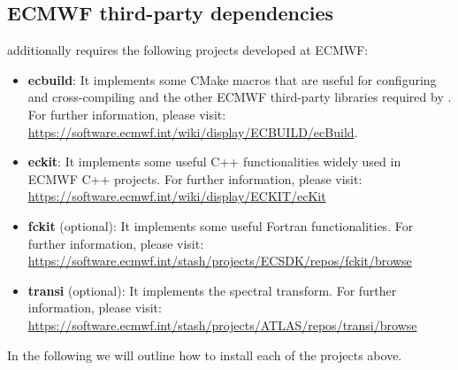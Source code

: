 \subsection{ECMWF third-party dependencies}
\label{s:ecmwf-libs}
\Atlas additionally requires the following projects developed 
at ECMWF:
%
\begin{itemize}
\item \textbf{ecbuild}: It implements some CMake macros that 
are useful for configuring and cross-compiling \Atlas and the 
other ECMWF third-party libraries required by \Atlas. 
For further information, please visit: 
\url{https://software.ecmwf.int/wiki/display/ECBUILD/ecBuild}.
\item \textbf{eckit}: It implements some useful C++
functionalities widely used in ECMWF C++ projects. 
For further information, please 
visit: \url{https://software.ecmwf.int/wiki/display/ECKIT/ecKit}
\item \textbf{fckit} (optional): It implements some useful 
Fortran functionalities. For further information, please 
visit: \url{https://software.ecmwf.int/stash/projects/ECSDK/repos/fckit/browse}
\item \textbf{transi} (optional): It implements the spectral 
transform. For further information, please visit:
\url{https://software.ecmwf.int/stash/projects/ATLAS/repos/transi/browse}
\end{itemize}
%
In the following we will outline how to install each of the 
projects above. 

